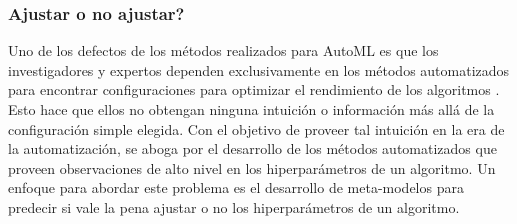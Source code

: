%
%
%
%

\subsubsection{Ajustar o no ajustar?}


Uno de los defectos de los métodos realizados para AutoML es que los investigadores y expertos dependen exclusivamente en los métodos automatizados para encontrar configuraciones para optimizar el rendimiento de los algoritmos \cite{rijn2018hyp}. Esto hace que ellos no obtengan ninguna intuición o información más allá de la configuración simple elegida. Con el objetivo de proveer tal intuición en la era de la automatización, se aboga por el desarrollo de los métodos automatizados que proveen observaciones de alto nivel en los hiperparámetros de un algoritmo. Un enfoque para abordar este problema es el desarrollo de meta-modelos para predecir si vale la pena ajustar o no los hiperparámetros de un algoritmo.

